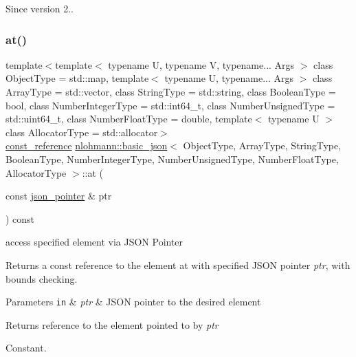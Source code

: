 \begin{DoxySince}{Since}
version 2.. 
\end{DoxySince}
\hypertarget{classnlohmann_1_1basic__json_a8faa955d51ec1f63b9ea9a7cc1eb93e8}{}\label{classnlohmann_1_1basic__json_a8faa955d51ec1f63b9ea9a7cc1eb93e8} 
\subsubsection{\texorpdfstring{at()}{at()}\hspace{0.1cm}{\footnotesize\ttfamily [6/6]}}
{\footnotesize\ttfamily template$<$template$<$ typename U, typename V, typename... Args $>$ class Object\+Type = std\+::map, template$<$ typename U, typename... Args $>$ class Array\+Type = std\+::vector, class String\+Type  = std\+::string, class Boolean\+Type  = bool, class Number\+Integer\+Type  = std\+::int64\+\_\+t, class Number\+Unsigned\+Type  = std\+::uint64\+\_\+t, class Number\+Float\+Type  = double, template$<$ typename U $>$ class Allocator\+Type = std\+::allocator$>$ \\
\hyperlink{classnlohmann_1_1basic__json_af677a29b0e66edc9f66e5167e4667071}{const\+\_\+reference} \hyperlink{classnlohmann_1_1basic__json}{nlohmann\+::basic\+\_\+json}$<$ Object\+Type, Array\+Type, String\+Type, Boolean\+Type, Number\+Integer\+Type, Number\+Unsigned\+Type, Number\+Float\+Type, Allocator\+Type $>$\+::at (\begin{DoxyParamCaption}\item[{const \hyperlink{classnlohmann_1_1basic__json_1_1json__pointer}{json\+\_\+pointer} \&}]{ptr }\end{DoxyParamCaption}) const\hspace{0.3cm}{\ttfamily [inline]}}



access specified element via J\+S\+ON Pointer 

Returns a const reference to the element at with specified J\+S\+ON pointer {\itshape ptr}, with bounds checking.


\begin{DoxyParams}[1]{Parameters}
\mbox{\tt in}  & {\em ptr} & J\+S\+ON pointer to the desired element\\
\hline
\end{DoxyParams}
\begin{DoxyReturn}{Returns}
reference to the element pointed to by {\itshape ptr} 
\end{DoxyReturn}
Constant.


